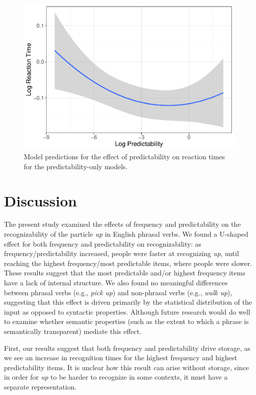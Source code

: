 \documentclass[
  man,floatsintext]{apa6}
\begin{document}
\begin{figure}

{\centering \includegraphics[width=0.6\linewidth]{write-up_files/figure-latex/PredicOnlyPlot-1} 

}

\caption{Model predictions for the effect of predictability on reaction times for the predictability-only models.}\label{fig:PredicOnlyPlot}
\end{figure}

\section{Discussion}\label{discussion}

The present study examined the effects of frequency and predictability on the recognizability of the particle \emph{up} in English phrasal verbs. We found a U-shaped effect for both frequency and predictability on recognizability: as frequency/predictability increased, people were faster at recognizing \emph{up}, until reaching the highest frequency/most predictable items, where people were slower. These results suggest that the most predictable and/or highest frequency items have a lack of internal structure. We also found no meaningful differences between phrasal verbs (e.g., \emph{pick up}) and non-phrasal verbs (e.g., \emph{walk up}), suggesting that this effect is driven primarily by the statistical distribution of the input as opposed to syntactic properties. Although future research would do well to examine whether semantic properties (such as the extent to which a phrase is semantically transparent) mediate this effect.

First, our results suggest that both frequency and predictability drive storage, as we see an increase in recognition times for the highest frequency and highest predictability items. It is unclear how this result can arise without storage, since in order for \emph{up} to be harder to recognize in some contexts, it must have a separate representation.
\end{document}
